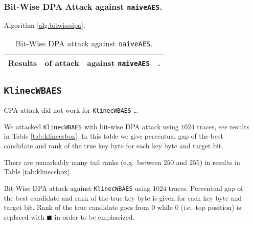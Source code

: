 \subsubsection{Bit-Wise DPA Attack against {\tt naiveAES}.}
	
	Algorithm \ref{alg:bitwisedpa}.
	
	\begin{table}[H]
		\begin{center}
		\begin{tabular}{| c | c | c | c |}
			\hline
			Results & of attack & against {\tt naiveAES} & . \\
			\hline
		\end{tabular}
		\end{center}
	\caption{Bit-Wise DPA attack against {\tt naiveAES}.}
	\label{tab:naiveaesdca}
	\end{table}



\subsection{\tt KlinecWBAES}
\label{sec:klinecwbaes}
	
	CPA attack did not work for {\tt KlinecWBAES} \ldots
	
	We attacked {\tt KlinecWBAES} with bit-wise DPA attack using $1024$ traces, see results in Table \ref{tab:klinecsbox}.
	In this table we give percentual gap of the best candidate and rank of the true key byte for each key byte and target bit.
	
	\begin{note}
	\label{note:tailrank}
		There are remarkably many tail ranks (e.g.\ between $250$ and $255$) in results in Table \ref{tab:klinecsbox}.
	\end{note}
	
	\begin{landscape}
	\begin{table}[H]   %
		\begin{center}
		
		\end{center}
	\caption{Bit-Wise DPA attack against {\tt KlinecWBAES} using $1024$ traces. Percentual gap of the best candidate and rank of the true key byte is given for each key byte and target bit. Rank of the true candidate goes from $0$ while $0$ (i.e.\ top position) is replaced with $\blacksquare$ in order to be emphasized.}
	\label{tab:klinecsbox}
	\end{table}
	\end{landscape}
	
